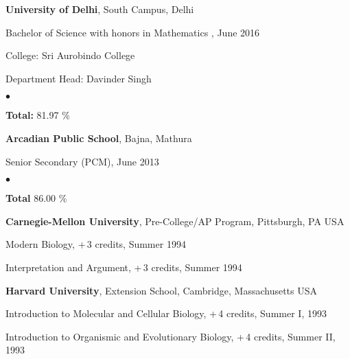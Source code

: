 \documentclass[margin,line]{res}
\newenvironment{list1}{
  \begin{list}{\ding{113}}{%
      \setlength{\itemsep}{0in}
      \setlength{\parsep}{0in} \setlength{\parskip}{0in}
      \setlength{\topsep}{0in} \setlength{\partopsep}{0in} 
      \setlength{\leftmargin}{0.17in}}}{\end{list}}
\newenvironment{list2}{
  \begin{list}{$\bullet$}{%
      \setlength{\itemsep}{0in}
      \setlength{\parsep}{0in} \setlength{\parskip}{0in}
      \setlength{\topsep}{0in} \setlength{\partopsep}{0in} 
      \setlength{\leftmargin}{0.2in}}}{\end{list}}
\begin{document}
\begin{resume}
{\bf University of Delhi}, South Campus, Delhi\\
\vspace*{-.1in}
\begin{list1}
\item[] Bachelor of Science with honors in Mathematics , June 2016
\vspace*{.05in}
\item[] College:  Sri Aurobindo College
\item[] Department Head:  Davinder Singh
\begin{list2}
\item[] {\bf \footnotesize Total:} 81.97 \%
\end{list2}
\end{list1}

{\bf Arcadian Public School}, Bajna, Mathura\\
\vspace*{-.1in}
\begin{list1}
\item[] Senior Secondary (PCM), June 2013
\begin{list2}
\item[] {\bf \footnotesize Total} 86.00 \%
\end{list2}
\end{list1}

{\bf Carnegie-Mellon University}, Pre-College/AP Program, Pittsburgh, PA USA\\
\vspace*{-.1in}
\begin{list1}
\item[] Modern Biology, +\,3 credits, Summer 1994
\item[] Interpretation and Argument, +\,3 credits, Summer 1994
\end{list1}

{\bf Harvard University}, Extension School, Cambridge, Massachusetts USA\\
\vspace*{-.1in}
\begin{list1}
\item[] Introduction to Molecular and Cellular Biology, +\,4 credits, Summer I, 1993
\item[] Introduction to Organismic and Evolutionary Biology, +\,4 credits, Summer II, 1993
\end{list1}


\end{resume}
\end{document}

